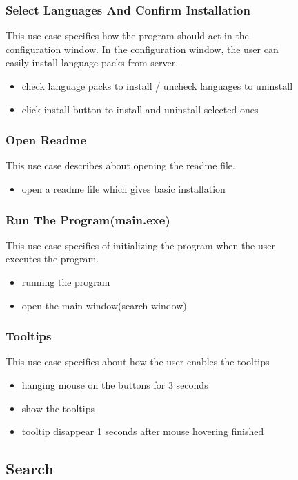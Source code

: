 \documentclass[conference]{IEEEtran}
\begin{document}
\begin{itemize}
\begin{itemize}
\begin{itemize}
\begin{itemize}
\begin{figure}[h]
\begin{enumerate}
\begin{itemize}
\begin{enumerate}
\subsubsection{Select Languages And Confirm Installation}
This use case specifies how the program should act in the configuration window. In the configuration window, the user can easily install language packs from server.
\begin{itemize}
  \item check language packs to install / uncheck languages to uninstall
  \item click install button to install and uninstall selected ones
\end{itemize}
\textit{}



\subsubsection{Open Readme}
This use case describes about opening the readme file.
\begin{itemize}
  \item open a readme file which gives basic installation
\end{itemize}
\textit{}

\subsubsection{Run The Program(main.exe)}
This use case specifies of initializing the program when the user executes the program.
\begin{itemize}
  \item running the program
  \item open the main window(search window)
\end{itemize}
\textit{}


\subsubsection{Tooltips}
This use case specifies about how the user enables the tooltips
\begin{itemize}
  \item hanging mouse on the buttons for 3 seconds
  \item show the tooltips
  \item tooltip disappear 1 seconds after mouse hovering finished
\end{itemize}
\textit{}

\subsection{Search}


\end{enumerate}
\end{itemize}
\end{enumerate}
\end{figure}
\end{itemize}
\end{itemize}
\end{itemize}
\end{itemize}
\end{document}
